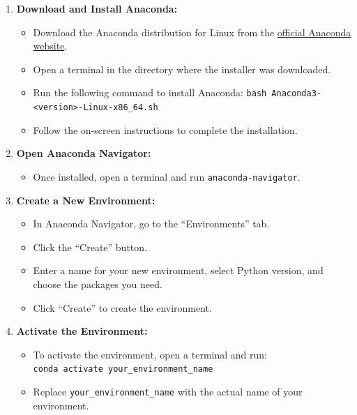 \documentclass[
  letterpaper,
  DIV=11,
  numbers=noendperiod]{scrreprt}
\providecommand{\tightlist}{%
  \setlength{\itemsep}{0pt}\setlength{\parskip}{0pt}}\usepackage{longtable,booktabs,array}
\begin{document}
\begin{enumerate}
\def\labelenumi{\arabic{enumi}.}
\tightlist
\item
  \textbf{Download and Install Anaconda:}

  \begin{itemize}
  \tightlist
  \item
    Download the Anaconda distribution for Linux from the
    \href{https://www.anaconda.com/products/distribution}{official
    Anaconda website}.
  \item
    Open a terminal in the directory where the installer was downloaded.
  \item
    Run the following command to install Anaconda:
    \texttt{bash\ Anaconda3-\textless{}version\textgreater{}-Linux-x86\_64.sh}
  \item
    Follow the on-screen instructions to complete the installation.
  \end{itemize}
\item
  \textbf{Open Anaconda Navigator:}

  \begin{itemize}
  \tightlist
  \item
    Once installed, open a terminal and run \texttt{anaconda-navigator}.
  \end{itemize}
\item
  \textbf{Create a New Environment:}

  \begin{itemize}
  \tightlist
  \item
    In Anaconda Navigator, go to the ``Environments'' tab.
  \item
    Click the ``Create'' button.
  \item
    Enter a name for your new environment, select Python version, and
    choose the packages you need.
  \item
    Click ``Create'' to create the environment.
  \end{itemize}
\item
  \textbf{Activate the Environment:}

  \begin{itemize}
  \tightlist
  \item
    To activate the environment, open a terminal and run:
    \texttt{conda\ activate\ your\_environment\_name}
  \item
    Replace \texttt{your\_environment\_name} with the actual name of
    your environment.
  \end{itemize}
\end{enumerate}
\end{document}
